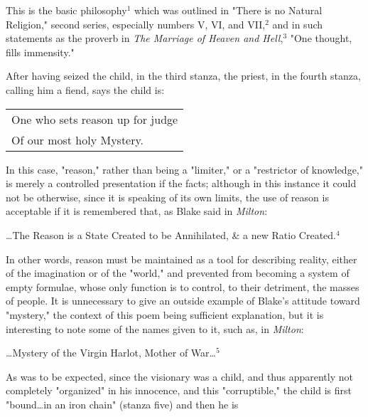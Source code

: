This is the basic philosophy$^{1}$ which was outlined in "There is no Natural Religion," second series,
especially numbers V, VI, and VII,$^{2}$ and in such statements as the proverb in \textit{The Marriage of Heaven and Hell},$^{3}$
"One thought, fills immensity."\par
\vspace*{0.5\baselineskip}
After having seized the child, in the third stanza, the priest, in the fourth stanza, calling him a fiend,
says the child is:\par
\begin{center}
	\begin{tabular}{l}
		One who sets reason up for judge \\
		Of our most holy Mystery.
	\end{tabular}
\end{center}
\hspace*{5mm}In this case, "reason," rather than being a "limiter," or a "restrictor of knowledge," is merely a controlled presentation
if the facts; although in this instance it could not be otherwise, since it is speaking of its own limits, the use of reason is 
acceptable if it is remembered that, as Blake said in \textit{Milton}:\par
\begin{center}
	\parbox{0.8\textwidth}{
		\centering
		\dots The Reason is a State Created to be Annihilated, \& a new Ratio Created.$^{4}$
	}%
\end{center}
\hspace*{5mm}In other words, reason must be maintained as a tool for describing reality, either of the imagination or of the "world," and
prevented from becoming a system of empty formulae, whose only function is to control, to their detriment, the masses of people.
It is unnecessary to give an outside example of Blake's attitude toward "mystery," the context of this poem being sufficient explanation,
but it is interesting to note some of the names given to it, such as, in \textit{Milton}:\par
\begin{center}
	\parbox{0.8\textwidth}{
		\centering
		\dots Mystery of the Virgin Harlot, Mother of War\dots$^{5}$
	}%
\end{center}
\hspace*{5mm}As was to be expected, since the visionary was a child, and thus apparently not completely "organized" in his
innocence, and this "corruptible," the child is first "bound\dots in an iron chain" (stanza five) and then he is 
